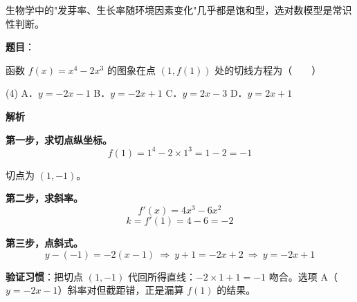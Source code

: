 \begin{answer}
\begin{gktip}
生物学中的"发芽率、生长率随环境因素变化"几乎都是饱和型，选对数模型是常识性判断。
\end{gktip}


\par\medskip

\end{answer}
\begin{answer}

\textbf{题目}：

函数 $f(x)=x^{4}-2x^{3}$ 的图象在点 $(1,f(1))$ 处的切线方程为\mbox{（　　）}

\begin{gkopts}(4)
\task A．$y=-2x-1$
\task B．$y=-2x+1$
\task C．$y=2x-3$
\task D．$y=2x+1$
\end{gkopts}

\textbf{解析}

\textbf{第一步，求切点纵坐标。}
\nopagebreak[4]
\[f(1)=1^{4}-2\times1^{3}=1-2=-1\]

切点为 $(1,-1)$。

\textbf{第二步，求斜率。}
\nopagebreak[4]
\[f'(x)=4x^{3}-6x^{2}\]
\nopagebreak[4]
\[k=f'(1)=4-6=-2\]

\textbf{第三步，点斜式。}
\nopagebreak[4]
\[y-(-1)=-2(x-1)\ \Longrightarrow\ y+1=-2x+2\ \Longrightarrow\ y=-2x+1\]

\begin{gktip}
\textbf{验证习惯}：把切点 $(1,-1)$ 代回所得直线：$-2\times1+1=-1$  吻合。选项 A（$y=-2x-1$）斜率对但截距错，正是漏算 $f(1)$ 的结果。
\end{gktip}


\par\medskip

\end{answer}
